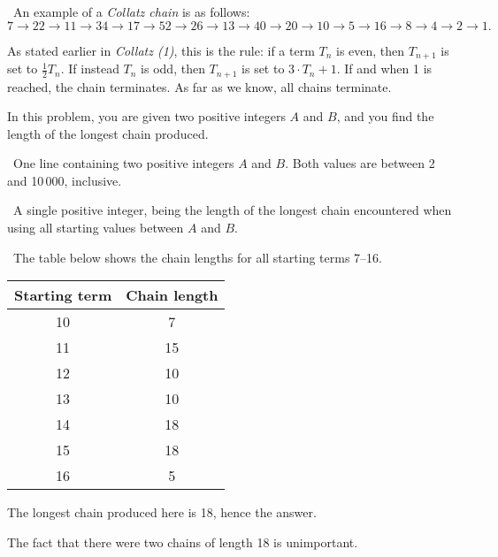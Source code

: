 

\Question\ An example of a \emph{Collatz chain} is as follows: \[
  7 \to 22 \to 11 \to 34 \to 17 \to 52 \to 26 \to 13 \to 40 \to 20 \to 10 \to 5 \to 16 \to
  8 \to 4 \to 2 \to 1.
\]

As stated earlier in \emph{Collatz (1)}, this is the rule: if a term $T_n$ is even, then
$T_{n+1}$ is set to $\frac12 T_n$. If instead $T_n$ is odd, then $T_{n+1}$ is set to
$3\cdot T_n + 1$. If and when 1 is reached, the chain terminates. As far as we know, all
chains terminate.

In this problem, you are given two positive integers $A$ and $B$, and you find the length
of the longest chain produced.

\Input\ One line containing two positive integers $A$ and $B$. Both values are between 2
and 10\,000, inclusive.

\Output\ A single positive integer, being the length of the longest chain encountered when
using all starting values between $A$ and $B$.

\Sample


\Explanation\ The table below shows the chain lengths for all starting terms 7--16.

\begin{center}
  \begin{tabular}{cc}
    \toprule
    Starting term & Chain length \\
    \midrule
    10            & 7            \\
    11            & 15           \\
    12            & 10           \\
    13            & 10           \\
    14            & 18           \\
    15            & 18           \\
    16            & 5            \\
    \bottomrule
  \end{tabular}
\end{center}

The longest chain produced here is 18, hence the answer.

The fact that there were two chains of length 18 is unimportant.
